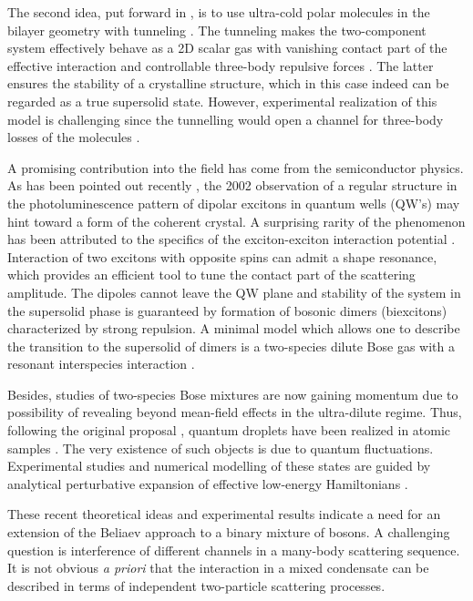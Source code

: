 \documentclass[reprint,superscriptaddress,showpacs,nofootinbib,aps,pra]{revtex4-1}
\begin{document}
The second idea, put forward in \cite{DiluteSupersolid}, is to use ultra-cold polar molecules in the bilayer geometry with tunneling \cite{PolarMolecules}. The tunneling makes the two-component system effectively behave as a 2D scalar gas with vanishing contact part of the effective interaction and controllable three-body repulsive forces \cite{Petrov2014}. The latter ensures the stability of a crystalline structure, which in this case indeed can be regarded as a true supersolid state. However, experimental realization of this model is challenging since the tunnelling would open a channel for three-body losses of the molecules \cite{Will}.

A promising contribution into the field has come from the semiconductor physics. As has been pointed out recently \cite{FragmentedSS}, the 2002 observation of a regular structure in the photoluminescence pattern of dipolar excitons in quantum wells (QW's) \cite{MOES} may hint toward a form of the coherent crystal. A surprising rarity of the phenomenon has been attributed to the specifics of the exciton-exciton interaction potential \cite{1Dscattering}. Interaction of two excitons with opposite spins can admit a shape resonance, which provides an efficient tool to tune the contact part of the scattering amplitude. The dipoles cannot leave the QW plane and stability of the system in the supersolid phase is guaranteed by formation of bosonic dimers (biexcitons) characterized by strong repulsion. A minimal model which allows one to describe the transition to the supersolid of dimers is a two-species dilute Bose gas with a resonant interspecies interaction \cite{ResonantPairing}.

Besides, studies of two-species Bose mixtures are now gaining momentum due to possibility of revealing beyond mean-field effects in the ultra-dilute regime. Thus, following the original proposal \cite{Petrov2015}, quantum droplets have been realized in atomic samples \cite{BoseMixture}. The very existence of such objects is due to quantum fluctuations. Experimental studies and numerical modelling of these states are guided by analytical perturbative expansion of effective low-energy Hamiltonians \cite{Petrov2015, Petrov2016, PetrovNature}.

These recent theoretical ideas and experimental results indicate a need for an extension of the Beliaev approach to a binary mixture of bosons. A challenging question is interference of different channels in a many-body scattering sequence. It is not obvious \textit{a priori} that the interaction in a mixed condensate can be described in terms of independent two-particle scattering processes.
\end{document}
